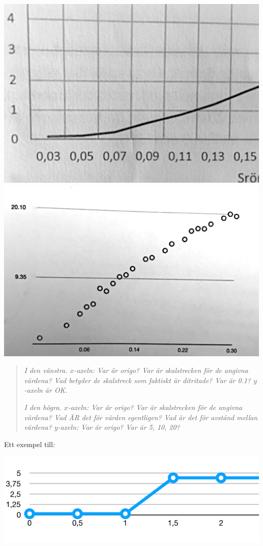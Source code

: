 \documentclass[onepage,swedish,a4paper,12pt]{scrbook}
\begin{document}
\begin{center}
\includegraphics[scale=.2]{skiss.jpg}
\includegraphics[scale=.2]{skiss1.jpg}
\end{center}

\begin{quote}
\emph{I den vänstra. $x$-axeln: Var är origo? Var är skalstrecken för de angivna värdena? Vad betyder de skalstreck som faktiskt är ditritade? Var är 0.1? $y$-axeln är OK.}

\emph{I den högra. $x$-axeln: Var är origo? Var är skalstrecken för de angivna värdena? Vad ÄR det för värden egentligen? Vad är det för avstånd mellan värdena? $y$-axeln: Var är origo? Var är 5, 10, 20?}
\end{quote}

Ett exempel till: 

\begin{center}
\includegraphics[scale=.7]{skiss3.pdf}
\end{center}
\end{document}
